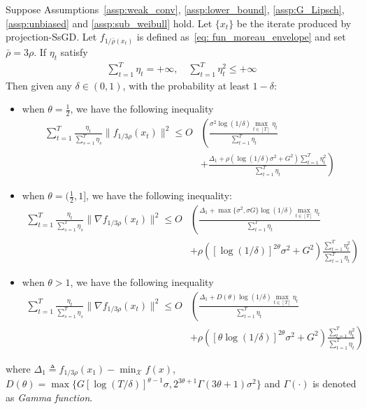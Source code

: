 \documentclass[10pt,a4paper]{amsart}
\def \X {\mathcal{X}}
\begin{document}
\begin{theorem}\label{thm: SsGD}
    Suppose Assumptions~\ref{assp:weak_conv}, \ref{assp:lower_bound}, \ref{assp:G_Lipsch}, \ref{assp:unbiased} and \ref{assp:sub_weibull} hold. Let $\{x_t\}$ be the iterate produced by projection-SsGD. Let $f_{1/\bar{\rho}(x_t)}$ is defined as~\eqref{eq: fun_moreau_envelope} and set $\bar{\rho}=3\rho$. If $\eta_t$ satisfy 
    \begin{align}
        \sum_{t=1}^T \eta_t = +\infty,\quad \sum_{t=1}^T\eta_t^2 \leq +\infty
    \end{align}
    Then given any $\delta\in(0,1)$, with the probability at least $1-\delta$:
        \begin{itemize}
        \item when $\theta=\frac{1}{2}$, we have the following inequality
            \begin{align}
                \sum_{t=1}^T \frac{\eta_t}{\sum_{s=1}^T\eta_s} \|f_{1/3\rho}(x_t)\|^2 \le O&\left(\frac{\sigma^2\log(1/\delta)\max_{t\in[T]}\eta_t}{\sum_{t=1}^T\eta_t}\right.\nonumber\\
        &\left.+\frac{\Delta_1+\rho(\log(1/\delta)\sigma^2+G^2)\sum_{t=1}^T\eta_t^2}{\sum_{t=1}^T\eta_t}\right)
            \end{align}
            \item when $\theta = (\frac{1}{2},1]$, we have the following inequality:
            \begin{align}
                \sum_{t=1}^T\frac{\eta_t}{\sum_{s=1}^T\eta_s}\|\nabla f_{1/3\rho}(x_t)\|^2\leq O&\left(\frac{\Delta_1+\max\{\sigma^2,\sigma G\}\log(1/\delta)\max_{t\in[T]}\eta_t}{\sum_{t=1}^T\eta_t}\right.\nonumber\\
                &\left.+\rho([\log(1/\delta)]^{2\theta}\sigma^2+G^2)\frac{\sum_{t=1}^T\eta_t^2}{\sum_{t=1}^T\eta_t}\right)
            \end{align}
            \item when $\theta>1$, we have the following inequality
            \begin{align}
                \sum_{t=1}^T\frac{\eta_t}{\sum_{s=1}^T\eta_s}\|\nabla f_{1/3\rho}(x_t)\|^2\leq O&\left(\frac{\Delta_1+D(\theta)\log(1/\delta)\max_{t\in[T]}\eta_t}{\sum_{t=1}^T\eta_t}\right.\nonumber\\
        &\left.+\rho([\theta\log(1/\delta)]^{2\theta}\sigma^2+G^2)\frac{\sum_{t=1}^T\eta_t^2}{\sum_{t=1}^T\eta_t}\right)
            \end{align}
        \end{itemize}
    where $\Delta_1\triangleq f_{1/3\rho}(x_1)-\min_\X f(x)$, $D(\theta)=\max\{ G[\log(T/\delta)]^{\theta-1}\sigma,2^{3\theta+1}\Gamma(3\theta+1)\sigma^2\}$ and $\Gamma(\cdot)$ is denoted as \textit{Gamma function}.
\end{theorem}
\end{document}
